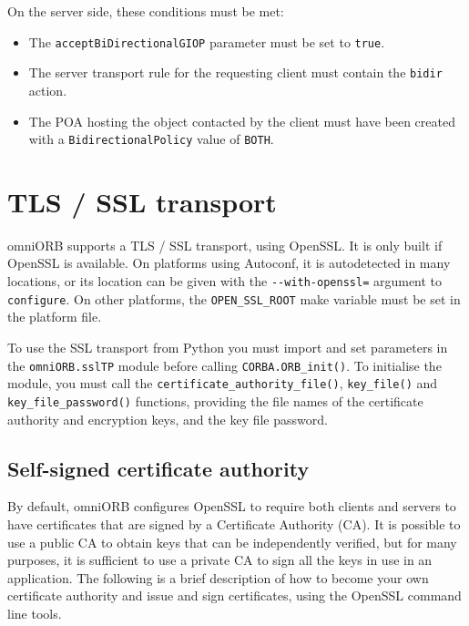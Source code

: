\documentclass[11pt,oneside,a4paper]{book}
\newcommand{\code}[1]{\texttt{#1}}
\newcommand{\op}[1]{\texttt{#1()}}
\begin{document}
\noindent On the server side, these conditions must be met:

\begin{itemize}

\item The \code{acceptBiDirectionalGIOP} parameter must be set to \code{true}. 
\item The server transport rule for the requesting client must contain
      the \code{bidir} action.
\item The POA hosting the object contacted by the client must have
      been created with a \code{BidirectionalPolicy} value of
      \code{BOTH}.

\end{itemize}


\section{TLS / SSL transport}

omniORB supports a TLS / SSL transport, using OpenSSL. It is only
built if OpenSSL is available. On platforms using Autoconf, it is
autodetected in many locations, or its location can be given with the
\code{-{}-with-openssl=} argument to \code{configure}. On other
platforms, the \code{OPEN\_SSL\_ROOT} make variable must be set in the
platform file.

To use the SSL transport from Python you must import and set
parameters in the \code{omniORB.sslTP} module before calling
\op{CORBA.ORB\_init}. To initialise the module, you must call the
\op{certificate\_authority\_file}, \op{key\_file} and
\op{key\_file\_password} functions, providing the file names of the
certificate authority and encryption keys, and the key file password.

\subsection{Self-signed certificate authority}

By default, omniORB configures OpenSSL to require both clients and
servers to have certificates that are signed by a Certificate
Authority (CA). It is possible to use a public CA to obtain keys that
can be independently verified, but for many purposes, it is sufficient
to use a private CA to sign all the keys in use in an application. The
following is a brief description of how to become your own certificate
authority and issue and sign certificates, using the OpenSSL command
line tools.
\end{document}
